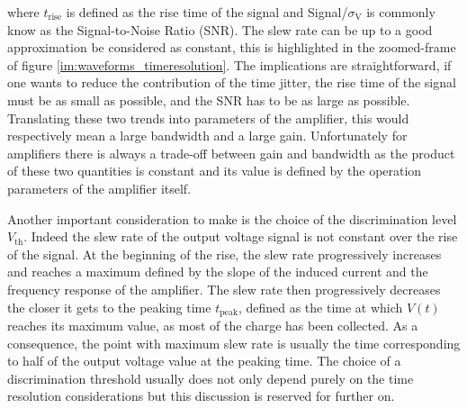 		where $t_{\text{rise}}$ is defined as the rise time of the signal and Signal/$\sigma_{\text{V}}$ is commonly know as the Signal-to-Noise Ratio (SNR). The slew rate can be up to a good approximation be considered as constant, this is highlighted in the zoomed-frame of figure \ref{im:waveforms_timeresolution}. The implications are straightforward, if one wants to reduce the contribution of the time jitter, the rise time of the signal must be as small as possible, and the SNR has to be as large as possible. Translating these two trends into parameters of the amplifier, this would respectively mean a large bandwidth and a large gain. Unfortunately for amplifiers there is always a trade-off between gain and bandwidth as the product of these two quantities is constant and its value is defined by the operation parameters of the amplifier itself. 
	
		Another important consideration to make is the choice of the discrimination level $V_{\text{th}}$. Indeed the slew rate of the output voltage signal is not constant over the rise of the signal. At the beginning of the rise, the slew rate progressively increases and reaches a maximum defined by the slope of the induced current and the frequency response of the amplifier. The slew rate then progressively decreases the closer it gets to the peaking time $t_{\text{peak}}$, defined as the time at which $V(t)$ reaches its maximum value, as most of the charge has been collected. As a consequence, the point with maximum slew rate is usually the time corresponding to half of the output voltage value at the peaking time. The choice of a discrimination threshold usually does not only depend purely on the time resolution considerations but this discussion is reserved for further on. 
		
		
